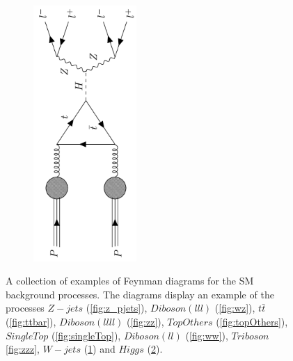 \begin{figure}
{\begin{subfigure}{.5\textwidth}
            \caption{}
            \label{fig:w_pjets}
        \end{subfigure}
        \hspace{1.1cm}
        \begin{subfigure}{.5\textwidth}
            \includegraphics[width=0.43\textwidth, angle = -90]{Figures/FDiagrams/h.png}
            \caption{}
            \label{fig:h}
        \end{subfigure}
    }
    \caption[Feynman diagrams of background processes.]{A collection of examples of Feynman diagrams for the \ac{SM} background processes.
    The diagrams display an example of the processes $Z-jets$ (\ref{fig:z_pjets}), $Diboson(lll)$
    (\ref{fig:wz}), $t\bar{t}$ (\ref{fig:ttbar}), $Diboson(llll)$ (\ref{fig:zz}), $TopOthers$ (\ref{fig:topOthers}),
    $SingleTop$ (\ref{fig:singleTop}), $Diboson(ll)$ (\ref{fig:ww}), $Triboson$ \ref{fig:zzz},
    $W-jets$ (\ref{fig:w_pjets}) and $Higgs$ (\ref{fig:h}).}
    \label{fig:Feynman}
\end{figure}
\newpage
